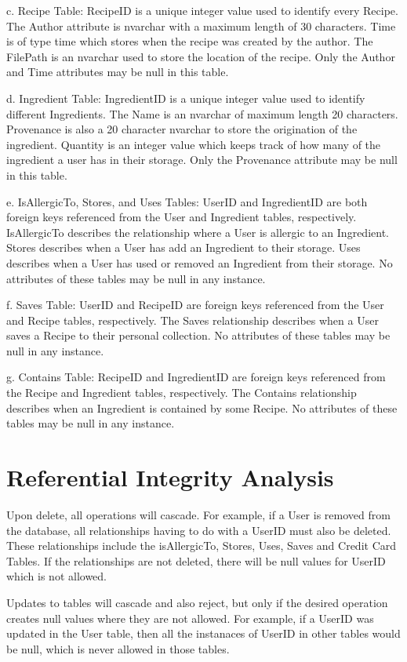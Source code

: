 \documentclass{article}
\begin{document}
c.	Recipe Table: RecipeID is a unique integer value used to identify every Recipe. The Author attribute is nvarchar with a maximum length of 30 characters. Time is of type time which stores when the recipe was created by the author. The FilePath is an nvarchar used to store the location of the recipe. Only the Author and Time attributes may be null in this table.

d.	Ingredient Table: IngredientID is a unique integer value used to identify different Ingredients. The Name is an nvarchar of maximum length 20 characters. Provenance is also a 20 character nvarchar to store the origination of the ingredient. Quantity is an integer value which keeps track of how many of the ingredient a user has in their storage. Only the Provenance attribute may be null in this table.

e.	IsAllergicTo, Stores, and Uses Tables: UserID and IngredientID are both foreign keys referenced from the User and Ingredient tables, respectively. IsAllergicTo describes the relationship where a User is allergic to an Ingredient. Stores describes when a User has add an Ingredient to their storage. Uses describes when a User has used or removed an Ingredient from their storage. No attributes of these tables may be null in any instance.

f.	Saves Table: UserID and RecipeID are foreign keys referenced from the User and Recipe tables, respectively. The Saves relationship describes when a User saves a Recipe to their personal collection. No attributes of these tables may be null in any instance.
 
g.	Contains Table: RecipeID and IngredientID are foreign keys referenced from the Recipe and Ingredient tables, respectively. The Contains relationship describes when an Ingredient is contained by some Recipe. No attributes of these tables may be null in any instance.

\section{Referential Integrity Analysis}
Upon delete, all operations will cascade. For example, if a User is removed from the database, all relationships having to do with a UserID must also be deleted. These relationships include the isAllergicTo, Stores, Uses, Saves and Credit Card Tables. If the relationships are not deleted, there will be null values for UserID which is not allowed.

Updates to tables will cascade and also reject, but only if the desired operation creates null values where they are not allowed. For example, if a UserID was updated in the User table, then all the instanaces of UserID in other tables would be null, which is never allowed in those tables.
\end{document}
